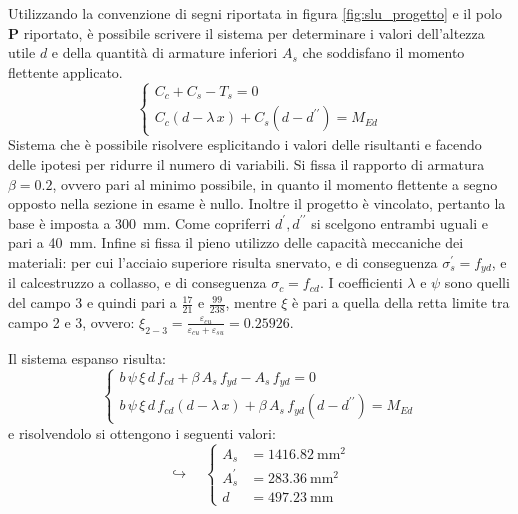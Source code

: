 Utilizzando la convenzione di segni riportata in figura \ref{fig:slu_progetto} e il polo $\mathbf{P}$ riportato, è possibile scrivere il sistema per determinare i valori dell'altezza utile $d$ e della quantità di armature inferiori $A_s$ che soddisfano il momento flettente applicato. 
\begin{equation}
  \begin{cases}
    C_c + C_s - T_s = 0 \\
    C_c \left(d - \lambda\,x\right) + C_s \left(d - d^{\prime\prime}\right) = M_{Ed}
  \end{cases}
\end{equation}
Sistema che è possibile risolvere esplicitando i valori delle risultanti e facendo delle ipotesi per ridurre il numero di variabili. 
Si fissa il rapporto di armatura $\beta = 0.2$, ovvero pari al minimo possibile, in quanto il momento flettente a segno opposto nella sezione in esame è nullo.
Inoltre il progetto è vincolato, pertanto la base è imposta a \SI{300}{\milli\metre}.
Come copriferri $d^\prime,d^{\prime\prime}$ si scelgono entrambi uguali e pari a \SI{40}{\milli\metre}.
Infine si fissa il pieno utilizzo delle capacità meccaniche dei materiali: per cui l'acciaio superiore risulta snervato, e di conseguenza $\sigma_s^\prime = f_{yd}$, e il calcestruzzo a collasso, e di conseguenza $\sigma_c = f_{cd}$.
I coefficienti $\lambda$ e $\psi$ sono quelli del campo 3 e quindi pari a $\frac{17}{21}$ e $\frac{99}{238}$, mentre $\xi$ è pari a quella della retta limite tra campo 2 e 3, ovvero: $\xi_{2-3} = \frac{\varepsilon_{cu}}{\varepsilon_{cu} + \varepsilon_{su}} = \num{0.25926}$.

Il sistema espanso risulta:
\begin{equation}
  \begin{cases}
    b \, \psi \, \xi \, d \, f_{cd} + \beta \, A_s \, f_{yd} - A_s \, f_{yd} = 0 \\
    b \, \psi \, \xi \, d \, f_{cd} \left(d - \lambda\,x\right) + \beta \, A_s \, f_{yd} \left(d - d^{\prime\prime}\right) = M_{Ed}
  \end{cases}
\label{eq:sistemaSLU}
\end{equation}
e risolvendolo si ottengono i seguenti valori:
\begin{equation}
  \hookrightarrow \quad
  \begin{cases}
    A_s &= \SI{1416.82}{\milli\metre\squared} \\
    A_s^\prime &= \SI{283.36}{\milli\metre\squared} \\
    d &= \SI{497.23}{\milli\metre}
  \end{cases}
\end{equation}

